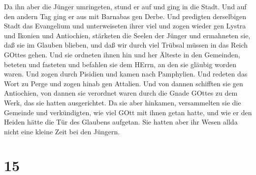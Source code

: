  Da ihn aber die Jünger umringeten, stund er auf und ging
in die Stadt. Und auf den andern Tag ging er aus mit Barnabas gen Derbe.
 Und predigten derselbigen Stadt das Evangelium und
unterweiseten ihrer viel und zogen wieder gen Lystra und Ikonien und
Antiochien,  stärketen die Seelen der Jünger und ermahneten
sie, daß sie im Glauben blieben, und daß wir durch viel Trübsal müssen
in das Reich GOttes gehen.  Und sie ordneten ihnen hin und
her Älteste in den Gemeinden, beteten und fasteten und befahlen sie dem
HErrn, an den sie gläubig worden waren.  Und zogen durch
Pisidien und kamen nach Pamphylien.  Und redeten das Wort
zu Perge und zogen hinab gen Attalien.  Und von dannen
schifften sie gen Antiochien, von dannen sie verordnet waren durch die
Gnade GOttes zu dem Werk, das sie hatten ausgerichtet.  Da
sie aber hinkamen, versammelten sie die Gemeinde und verkündigten, wie
viel GOtt mit ihnen getan hatte, und wie er den Heiden hätte die Tür des
Glaubens aufgetan.  Sie hatten aber ihr Wesen allda nicht
eine kleine Zeit bei den Jüngern.

\hypertarget{section-14}{%
\section{15}\label{section-14}}

